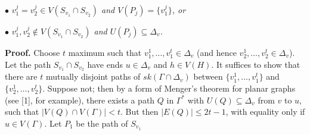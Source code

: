 \hspace*{12pt}$\bullet$ \textit{$v_1^j = v_2^j \in V(S_{v_1} \cap S_{v_2})$ and $V(P_j) = \{v_1^j\}$, or}

\hspace*{12pt}$\bullet$ \textit{$v_1^j, v_2^j \notin V(S_{v_1} \cap S_{v_2})$ and $U(P_j) \subseteq \Delta_v$.}

\textbf{Proof.} Choose $t$ maximum such that $v_1^1, \dots, v_1^t \in \Delta_v$ (and hence $v_2^1, \dots, v_2^t \in \Delta_v$). Let the path $S_{v_1} \cap S_{v_2}$ have ends $u \in \Delta_v$ and $h \in V(H)$. It suffices to show that there are $t$ mutually disjoint paths of $sk(\Gamma \cap \Delta_v)$ between $\{v_1^1, \dots, v_1^t\}$ and $\{v_2^1, \dots, v_2^t\}$. Suppose not; then by a form of Menger's theorem for planar graphs (see [1], for example), there exists a path $Q$ in $\Gamma^*$ with $U(Q) \subseteq \Delta_v$ from $v$ to $u$, such that $|V(Q) \cap V(\Gamma)| < t$. But then $|E(Q)| \le 2t - 1$, with equality only if $u \in V(\Gamma)$. Let $P_1$ be the path of $S_{v_1}$
